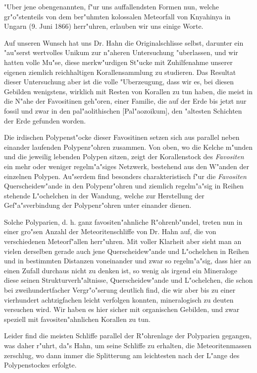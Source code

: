 \documentclass[a4paper, 12pt, oneside]{article}
\begin{document}
"Uber jene obengenannten, f"ur uns auffallendsten Formen nun, welche gr"o"stenteils von dem ber"uhmten kolossalen Meteorfall von Knyahinya in Ungarn (9. Juni 1866) herr"uhren, erlauben wir uns einige Worte.

Auf unseren Wunsch hat uns Dr. Hahn die Originalschlisse selbst, darunter ein "au"serst wertvolles Unikum zur n"aheren Untersuchung "uberlassen, und wir hatten volle Mu"se, diese merkw"urdigen St"ucke mit Zuhilfenahme unserer eigenen ziemlich reichhaltigen Korallensammlung zu studieren. Das Resultat dieser Untersuchung aber ist die volle "Uberzeugung, dass wir es, bei diesen Gebilden wenigstens, wirklich mit Resten von Korallen zu tun haben, die meist in die N"ahe der Favositinen geh"oren, einer Familie, die auf der Erde bis jetzt nur fossil und zwar in den pal"aolithischen [Pal"aozoikum], den "altesten Schichten der Erde gefunden worden.

Die irdischen Polypenst"ocke dieser Favositinen setzen sich aus parallel neben einander laufenden Polypenr"ohren zusammen. Von oben, wo die Kelche m"unden und die jeweilig lebenden Polypen sitzen, zeigt der Korallenstock des \emph{Favositen} ein mehr oder weniger regelm"a"siges Netzwerk, bestehend aus den W"anden der einzelnen Polypen. Au"serdem find besonders charakteristisch f"ur die \emph{Favositen} Querscheidew"ande in den Polypenr"ohren und ziemlich regelm"a"sig in Reihen stehende L"ochelchen in der Wandung, welche zur Herstellung der Gef"a"sverbindung der Polypenr"ohren unter einander dienen.

Solche Polyparien, d. h. ganz favositen"ahnliche R"ohrenb"undel, treten nun in einer gro"sen Anzahl der Meteoritenschliffe von Dr. Hahn auf, die von verschiedenen Meteorf"allen herr"uhren. Mit voller Klarheit aber sieht man an vielen derselben gerade auch jene Querscheidew"ande und L"ochelchen in Reihen und in bestimmten Distanzen voneinander und zwar so regelm"a"sig, dass hier an einen Zufall durchaus nicht zu denken ist, so wenig als irgend ein Mineraloge diese seinen Strukturverh"altnisse, Querscheidew"ande und L"ochelchen, die schon bei zweihundertfacher Vergr"o"serung deutlich find, die wir aber bis zu einer vierhundert achtzigfachen leicht verfolgen konnten, mineralogisch zu deuten versuchen wird. Wir haben es hier sicher mit organischen Gebilden, und zwar speziell mit favositen"ahnlichen Korallen zu tun.

Leider find die meisten Schliffe parallel der R"ohrenlage der Polyparien gegangen, was daher r"uhrt, da"s Hahn, um seine Schliffe zu erhalten, die Meteoritenmassen zerschlug, wo dann immer die Splitterung am leichtesten nach der L"ange des Polypenstockes erfolgte.
\end{document}
